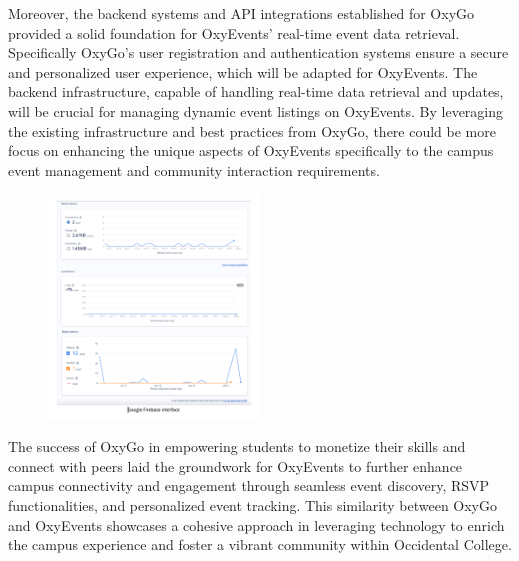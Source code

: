 \documentclass[10pt,twocolumn]{article}
\begin{document}
Moreover, the backend systems and API integrations established for OxyGo provided a solid foundation for OxyEvents' real-time event data retrieval. Specifically OxyGo's user registration and authentication systems ensure a secure and personalized user experience, which will be adapted for OxyEvents. The backend infrastructure, capable of handling real-time data retrieval and updates, will be crucial for managing dynamic event listings on OxyEvents. By leveraging the existing infrastructure and best practices from OxyGo, there could be more focus on enhancing the unique aspects of OxyEvents specifically to the campus event management and community interaction requirements.

\begin{figure}[h!]
\includegraphics[width=0.5\textwidth]{images/Firebase.png}
\centering
\end{figure} 

The success of OxyGo in empowering students to monetize their skills and connect with peers laid the groundwork for OxyEvents to further enhance campus connectivity and engagement through seamless event discovery, RSVP functionalities, and personalized event tracking. This similarity between OxyGo and OxyEvents showcases a cohesive approach in leveraging technology to enrich the campus experience and foster a vibrant community within Occidental College.
\end{document}
